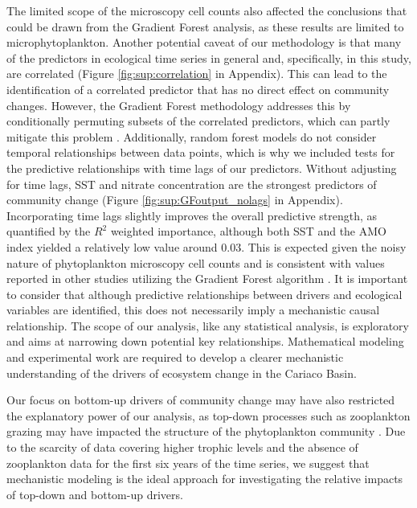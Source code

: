 \documentclass[draft]{agujournal2019}
\begin{document}
    
    The limited scope of the microscopy cell counts also affected the conclusions that could be drawn from the Gradient Forest analysis, as these results are limited to microphytoplankton. 
    Another potential caveat of our methodology is that many of the predictors in ecological time series in general and, specifically, in this study, are correlated (Figure \ref{fig:sup:correlation} in Appendix). This can lead to the identification of a correlated predictor that has no direct effect on community changes. However, the Gradient Forest methodology addresses this by conditionally permuting subsets of the correlated predictors, which can partly mitigate this problem \cite{ellis_gradient_2012}. Additionally, random forest models do not consider temporal relationships between data points, which is why we included tests for the predictive relationships with time lags of our predictors. Without adjusting for time lags, SST and nitrate concentration are the strongest predictors of community change (Figure \ref{fig:sup:GFoutput_nolags} in Appendix). Incorporating time lags slightly improves the overall predictive strength, as quantified by the $R^2$ weighted importance, although both SST and the AMO index yielded a relatively low value around \qty{0.03}{}. This is expected given the noisy nature of phytoplankton microscopy cell counts and is consistent with values reported in other studies utilizing the Gradient Forest algorithm \cite{pitcher_example_2012, roland_pitcher_exploring_2012, roubeix_identification_2016, samhouri_defining_2017, fraker_temporal_2022}. It is important to consider that although predictive relationships between drivers and ecological variables are identified, this does not necessarily imply a mechanistic causal relationship. The scope of our analysis, like any statistical analysis, is exploratory and aims at narrowing down potential key relationships. Mathematical modeling and experimental work are required to develop a clearer mechanistic understanding of the drivers of ecosystem change in the Cariaco Basin.
     
    Our focus on bottom-up drivers of community change may have also restricted the explanatory power of our analysis, as top-down processes such as zooplankton grazing may have impacted the structure of the phytoplankton community \cite{frank_ups_2007, banas_adding_2011, acevedo-trejos_mechanisms_2015}. Due to the scarcity of data covering higher trophic levels and the absence of zooplankton data for the first six years of the time series, we suggest that mechanistic modeling is the ideal approach for investigating the relative impacts of top-down and bottom-up drivers.
    
\end{document}
